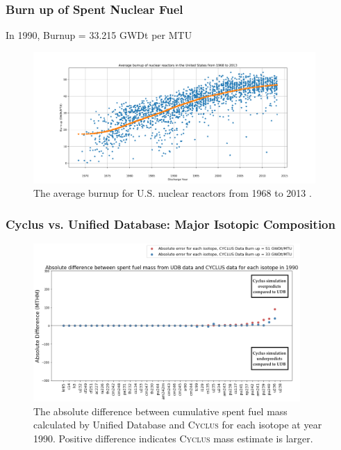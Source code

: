 \begin{frame}
    \frametitle{Burn up of Spent Nuclear Fuel}
    In 1990, Burnup = 33.215 GWDt per MTU

    \begin{figure}[htbp!]
        \begin{center}
        \includegraphics[height=5cm]{../figures/burnup_udb}
        \end{center}
        \caption{The average burnup for U.S. nuclear reactors
        from 1968 to 2013 \cite{peterson_unf_2017}.}
        \end{figure}
    \end{frame}

\begin{frame}
    \frametitle{Cyclus vs. Unified Database: Major Isotopic Composition}
    \begin{figure}[htbp!]
        \begin{center}
          \includegraphics[height=6cm]{../figures/absolute_diff_1990}
        \end{center}
              \caption{The absolute difference between cumulative spent fuel mass calculated by 
              Unified Database and \textsc{Cyclus} for each isotope at year 1990. Positive difference indicates \textsc{Cyclus}
              mass estimate is larger.}
        \label{fig:totalmass}
      \end{figure}
\end{frame}

